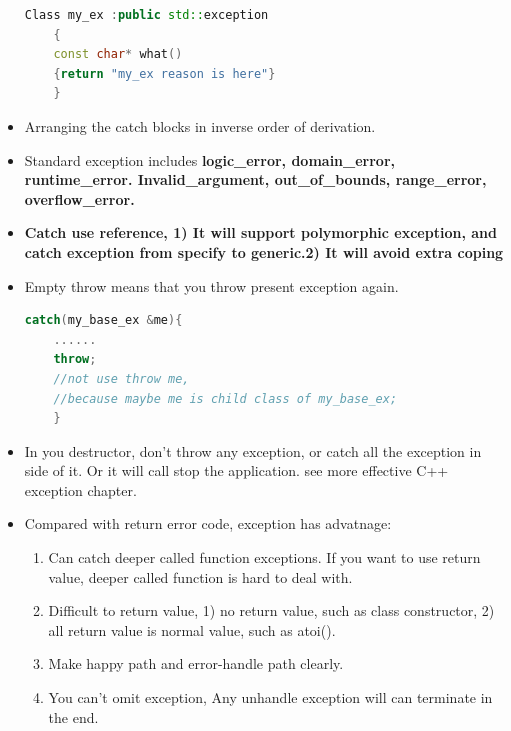 \documentclass[a4paper,12pt,twoside]{book}
\begin{document}
\begin{itemize}
	\begin{lstlisting}[frame=single, language=c++]
	Class my_ex :public std::exception
	{
	const char* what()
	{return "my_ex reason is here"}
	}
	\end{lstlisting}
	
	\item Arranging the catch blocks in inverse order of derivation.
	
	\item Standard exception includes \textbf{logic\_error, domain\_error,  runtime\_error.  Invalid\_argument, out\_of\_bounds, range\_error, overflow\_error.}
	
	\item \textbf{Catch use reference, 1) It will support polymorphic exception, and catch exception from specify to generic.2) It will avoid extra coping}
	
	\item Empty throw means that you throw present exception again.
	\begin{lstlisting}[frame=single, language=c++]
	catch(my_base_ex &me){
	......
	throw;
	//not use throw me,
	//because maybe me is child class of my_base_ex;
	}
	\end{lstlisting}
	
	\item In you destructor, don't throw any exception, or catch all the exception in side of it. Or it will call stop the application. see more effective C++ exception chapter.
	
	\item Compared with return error code, exception has advatnage:
	\begin{enumerate}
		\item  Can catch deeper called function exceptions. If you want to use return value, deeper called function is hard to deal with.
		\item Difficult to return value, 1) no return value, such as class constructor, 2) all return value is normal value, such as atoi().
		\item Make happy path and error-handle path clearly.
		\item You can't omit exception, Any unhandle exception will can terminate in the end.
	\end{enumerate}
	
\end{itemize}
\end{document}
